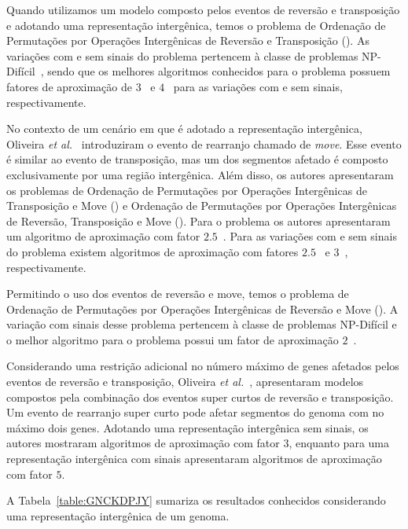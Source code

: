 Quando utilizamos um modelo composto pelos eventos de reversão e transposição e adotando uma representação intergênica, temos o problema de Ordenação de Permutações por Operações Intergênicas de Reversão e Transposição (\SbIRT). As variações com e sem sinais do problema pertencem à classe de problemas NP-Difícil~\cite{2021a-oliveira-etal,2020a-brito-etal}, sendo que os melhores algoritmos conhecidos para o problema possuem fatores de aproximação de $3$~\cite{2021a-oliveira-etal} e $4$~\cite{2021b-brito-etal} para as variações com e sem sinais, respectivamente.

No contexto de um cenário em que é adotado a representação intergênica, Oliveira \textit{et al.}~\cite{2021a-oliveira-etal} introduziram o evento de rearranjo chamado de \emph{move}. Esse evento é similar ao evento de transposição, mas um dos segmentos afetado é composto exclusivamente por uma região intergênica. Além disso, os autores apresentaram os problemas de Ordenação de Permutações por Operações Intergênicas de Transposição e Move (\SbITM) e Ordenação de Permutações por Operações Intergênicas de Reversão, Transposição e Move (\SbIRTM). Para o problema \SbITM{} os autores apresentaram um algoritmo de aproximação com fator $2.5$~\cite{2021a-oliveira-etal}. Para as variações com e sem sinais do problema \SbIRTM{} existem algoritmos de aproximação com fatores $2.5$~\cite{2021a-oliveira-etal} e $3$~\cite{2021b-brito-etal}, respectivamente.  

Permitindo o uso dos eventos de reversão e move, temos o problema de Ordenação de Permutações por Operações Intergênicas de Reversão e Move (\SbIRM). A variação com sinais desse problema pertencem à classe de problemas NP-Difícil e o melhor algoritmo para o problema possui um fator de aproximação $2$~\cite{2022b-brito-etal}.

Considerando uma restrição adicional no número máximo de genes afetados pelos eventos de reversão e transposição, Oliveira \textit{et al.}~\cite{2019c-oliveira-etal}, apresentaram modelos compostos pela combinação dos eventos super curtos de reversão e transposição. Um evento de rearranjo super curto pode afetar segmentos do genoma com no máximo dois genes. Adotando uma representação intergênica sem sinais, os autores mostraram algoritmos de aproximação com fator $3$, enquanto para uma representação intergênica com sinais apresentaram algoritmos de aproximação com fator $5$.

A Tabela~\ref{table:GNCKDPJY} sumariza os resultados conhecidos considerando uma representação intergênica de um genoma.

